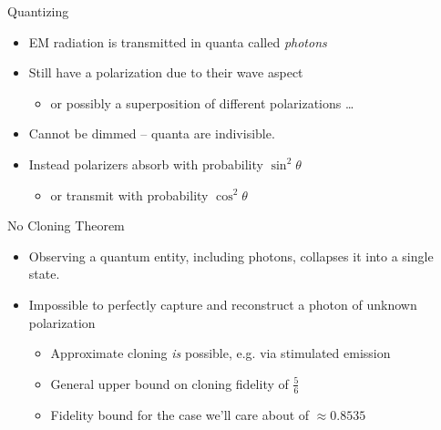 \documentclass[pdf]{beamer}
\begin{document}
\begin{frame}{Quantizing}
  \begin{itemize}
  \item EM radiation is transmitted in quanta called \emph{photons}
  \item Still have a polarization due to their wave aspect
    \begin{itemize}
    \item or possibly a superposition of different polarizations \ldots
    \end{itemize}
  \item Cannot be dimmed -- quanta are indivisible.
  \item Instead polarizers absorb with probability $\sin^2\theta$
    \begin{itemize}
    \item or transmit with probability $\cos^2\theta$
    \end{itemize}
  \end{itemize}
\end{frame}
\begin{frame}{No Cloning Theorem}
  \begin{itemize}
  \item Observing a quantum entity, including photons, collapses it into a
    single state.
  \item Impossible to perfectly capture and reconstruct a photon of
    unknown polarization
    \begin{itemize}
    \item Approximate cloning \emph{is} possible, e.g. via stimulated emission
    \item General upper bound on cloning fidelity of $\frac{5}{6}$
    \item Fidelity bound for the case we'll care about of $\approx 0.8535$
    \end{itemize}
  \end{itemize}
\end{frame}
\end{document}
